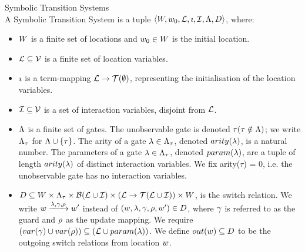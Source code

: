 \begin{definition} Symbolic Transition Systems \\
A Symbolic Transition System is a tuple $\langle W,w_0,\mathcal{L},\imath,\mathcal{I},\Lambda,D\rangle$, where:
\begin{itemize}
\item $W$ is a finite set of locations and $w_0 \in W$ is the initial location.
\item $\mathcal{L} \subseteq \mathcal{V}$ is a finite set of location variables.
\item $\imath$ is a term-mapping $\mathcal{L} \rightarrow \mathcal{T}(\emptyset)$, representing the initialisation of the location variables.
\item $\mathcal{I} \subseteq \mathcal{V}$ is a set of interaction variables, disjoint from $\mathcal{L}$.
\item $\Lambda$ is a finite set of gates. The unobservable gate is denoted $\tau (\tau \notin \Lambda)$; we write $\Lambda_\tau$ for $\Lambda \cup \{\tau\}$. The arity of a gate $\lambda\in\Lambda_\tau$, denoted $arity(\lambda)$, is a natural number. The parameters of a gate $\lambda\in\Lambda_\tau$, denoted $param(\lambda)$, are a tuple of length $arity(\lambda)$ of distinct interaction variables. We fix arity($\tau$) = 0, i.e. the unobservable gate has no interaction variables.
\item $D \subseteq W \times \Lambda_\tau \times \mathcal{B}(\mathcal{L} \cup \mathcal{I}) \times (\mathcal{L} \rightarrow \mathcal{T}(\mathcal{L} \cup \mathcal{I})) \times W$, is the switch relation. We write $w\xrightarrow{\lambda,\gamma,\rho}w'$ instead of $(w,\lambda,\gamma,\rho,w')\in D$, where $\gamma$ is referred to as the guard and $\rho$ as the update mapping. We require $(var(\gamma) \cup var(\rho)) \subseteq (\mathcal{L} \cup param(\lambda))$. We define $out(w) \subseteq D$ to be the outgoing switch relations from location $w$.
\end{itemize}
\end{definition}

